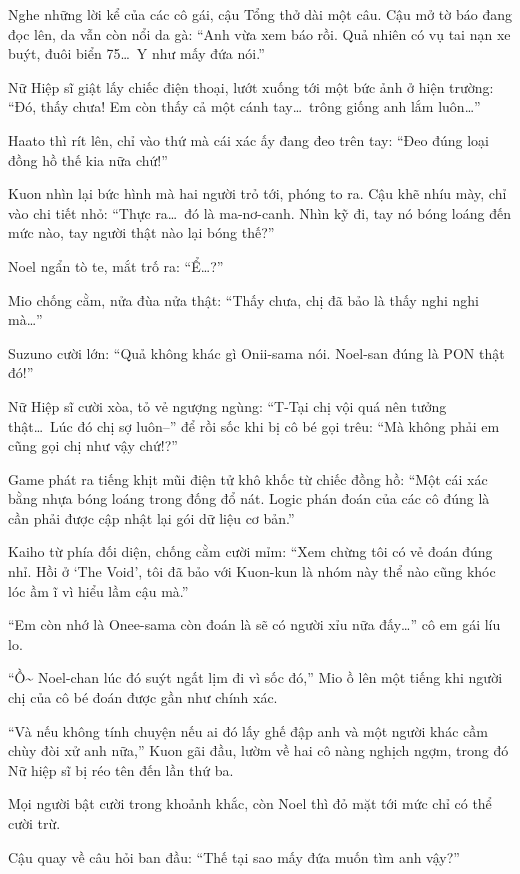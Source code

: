 \documentclass[../main.tex]{subfiles}
\begin{document}
Nghe những lời kể của các cô gái, cậu Tổng thở dài một câu. Cậu mở tờ báo đang đọc lên, da vẫn còn nổi da gà: ``Anh vừa xem báo rồi. Quả nhiên có vụ tai nạn xe buýt, đuôi biển 75\dots\ Y như mấy đứa nói.''

Nữ Hiệp sĩ giật lấy chiếc điện thoại, lướt xuống tới một bức ảnh ở hiện trường: ``Đó, thấy chưa! Em còn thấy cả một cánh tay\dots\ trông giống anh lắm luôn\dots''

Haato thì rít lên, chỉ vào thứ mà cái xác ấy đang đeo trên tay: ``Đeo đúng loại đồng hồ thế kia nữa chứ!''

Kuon nhìn lại bức hình mà hai người trỏ tới, phóng to ra. Cậu khẽ nhíu mày, chỉ vào chi tiết nhỏ: ``Thực ra\dots\ đó là ma-nơ-canh. Nhìn kỹ đi, tay nó bóng loáng đến mức nào, tay người thật nào lại bóng thế?''

Noel ngẩn tò te, mắt trố ra: ``Ể\dots?''

Mio chống cằm, nửa đùa nửa thật: ``Thấy chưa, chị đã bảo là thấy nghi nghi mà\dots''

Suzuno cười lớn: ``Quả không khác gì Onii-sama nói. Noel-san đúng là PON thật đó!''

Nữ Hiệp sĩ cười xòa, tỏ vẻ ngượng ngùng: ``T-Tại chị vội quá nên tưởng thật\dots\ Lúc đó chị sợ luôn--'' để rồi sốc khi bị cô bé gọi trêu: ``Mà không phải em cũng gọi chị như vậy chứ!?''

Game phát ra tiếng khịt mũi điện tử khô khốc từ chiếc đồng hồ: ``Một cái xác bằng nhựa bóng loáng trong đống đổ nát. Logic phán đoán của các cô đúng là cần phải được cập nhật lại gói dữ liệu cơ bản.''

Kaiho từ phía đối diện, chống cằm cười mỉm: ``Xem chừng tôi có vẻ đoán đúng nhỉ. Hồi ở `The Void', tôi đã bảo với Kuon-kun là nhóm này thể nào cũng khóc lóc ầm ĩ vì hiểu lầm cậu mà.''

``Em còn nhớ là Onee-sama còn đoán là sẽ có người xỉu nữa đấy\dots'' cô em gái líu lo.

``Ồ\~{} Noel-chan lúc đó suýt ngất lịm đi vì sốc đó,'' Mio ồ lên một tiếng khi người chị của cô bé đoán được gần như chính xác.

``Và nếu không tính chuyện nếu ai đó lấy ghế đập anh và một người khác cầm chùy đòi xử  anh nữa,'' Kuon gãi đầu, lườm về hai cô nàng nghịch ngợm, trong đó Nữ hiệp sĩ bị réo tên đến lần thứ ba.

Mọi người bật cười trong khoảnh khắc, còn Noel thì đỏ mặt tới mức chỉ có thể cười trừ.

Cậu quay về câu hỏi ban đầu: ``Thế tại sao mấy đứa muốn tìm anh vậy?''
\end{document}
